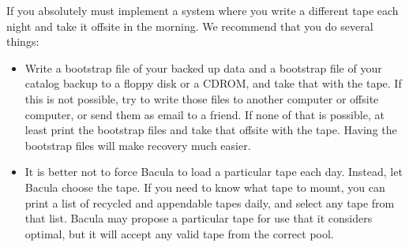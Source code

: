 If you absolutely must implement a system where you write a different 
tape each night and take it offsite in the morning. We recommend that you do 
several things:
\begin{itemize}
\item Write a bootstrap file of your backed up data and a bootstrap file
   of your catalog backup to a floppy disk or a CDROM, and take that with
   the tape.  If this is not possible, try to write those files to another 
   computer or offsite computer, or send them as email to a friend. If none
   of that is possible, at least print the bootstrap files and take that
   offsite with the tape.  Having the bootstrap files will make recovery
   much easier.
\item It is better not to force Bacula to load a particular tape each day.
   Instead, let Bacula choose the tape.  If you need to know what tape to
   mount, you can print a list of recycled and appendable tapes daily, and
   select any tape from that list.  Bacula may propose a particular tape
   for use that it considers optimal, but it will accept any valid tape
   from the correct pool.
\end{itemize}
